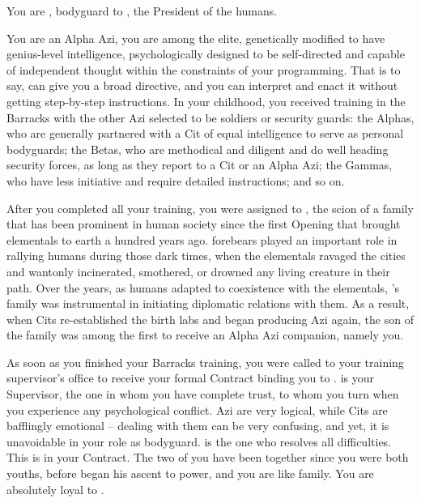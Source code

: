 \documentclass[char]{elementals}
\begin{document}
\name{\cRomeo{}}

You are \cRomeo{\intro}, bodyguard to \cLeader{\intro}, the President of the humans.

You are an Alpha Azi, you are among the elite, genetically modified to have genius-level intelligence, psychologically designed to be self-directed and capable of independent thought within the constraints of your programming.  That is to say, \cLeader{} can give you a broad directive, and you can interpret and enact it without getting step-by-step instructions.  In your childhood, you received training in the Barracks with the other Azi selected to be soldiers or security guards: the Alphas, who are generally partnered with a Cit of equal intelligence to serve as personal bodyguards; the Betas, who are methodical and diligent and do well heading security forces, as long as they report to a Cit or an Alpha Azi; the Gammas, who have less initiative and require detailed instructions; and so on.

After you completed all your training, you were assigned to \cLeader{}, the scion of a family that has been prominent in human society since the first Opening that brought elementals to earth a hundred years ago.  \cLeader{\Their} forebears played an important role in rallying humans during those dark times, when the elementals ravaged the cities and wantonly incinerated, smothered, or drowned any living creature in their path.  Over the years, as humans adapted to coexistence with the elementals, \cLeader{}'s family was instrumental in initiating diplomatic relations with them.  As a result, when Cits re-established the birth labs and began producing Azi again, the son of the \cLeader{\formal} family was among the first to receive an Alpha Azi companion, namely you.

As soon as you finished your Barracks training, you were called to your training supervisor's office to receive your formal Contract binding you to \cLeader{}.  \cLeader{\They} is your Supervisor, the one in whom you have complete trust, to whom you turn when you experience any psychological conflict.  Azi are very logical, while Cits are bafflingly emotional -- dealing with them can be very confusing, and yet, it is unavoidable in your role as bodyguard.  \cLeader{} is the one who resolves all difficulties.  This is in your Contract.  The two of you have been together since you were both youths, before \cLeader{\they} began his ascent to power, and you are like family.  You are absolutely loyal to \cLeader{\them}.
\end{document}

